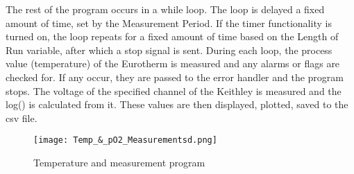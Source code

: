     The rest of the program occurs in a while loop.
    The loop is delayed a fixed amount of time, set by the Measurement Period.
    If the timer functionality is turned on, the loop repeats for a fixed amount of time based on the Length of Run variable, after which a stop signal is sent.
    During each loop, the process value (temperature) of the Eurotherm is measured and any alarms or flags are checked for.
    If any occur, they are passed to the error handler and the program stops.
    The voltage of the specified channel of the Keithley is measured and the log() is calculated from it.
    These values are then displayed, plotted, saved to the \gls{csv} file.

    \begin{landscape}%
        \begin{figure}
            \begin{center}
            \texttt{[image: Temp\_\&\_pO2\_Measurementsd.png]}
            \end{center}
            \caption{Temperature and  measurement program}
            \label{fig:tempvi}
        \end{figure}
    \end{landscape}
